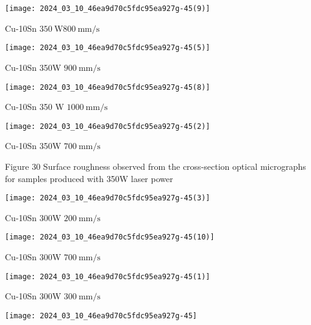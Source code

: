\documentclass[10pt]{article}
\begin{document}
\begin{center}
\texttt{[image: 2024\_03\_10\_46ea9d70c5fdc95ea927g-45(9)]}
\end{center}

Cu-10Sn $350 \mathrm{~W} 800 \mathrm{~mm} / \mathrm{s}$

\begin{center}
\texttt{[image: 2024\_03\_10\_46ea9d70c5fdc95ea927g-45(5)]}
\end{center}

Cu-10Sn 350W $900 \mathrm{~mm} / \mathrm{s}$

\begin{center}
\texttt{[image: 2024\_03\_10\_46ea9d70c5fdc95ea927g-45(8)]}
\end{center}

Cu-10Sn 350 W $1000 \mathrm{~mm} / \mathrm{s}$

\begin{center}
\texttt{[image: 2024\_03\_10\_46ea9d70c5fdc95ea927g-45(2)]}
\end{center}

Cu-10Sn 350W $700 \mathrm{~mm} / \mathrm{s}$

Figure 30 Surface roughness observed from the cross-section optical micrographs for samples produced with 350W laser power

\begin{center}
\texttt{[image: 2024\_03\_10\_46ea9d70c5fdc95ea927g-45(3)]}
\end{center}

Cu-10Sn 300W $200 \mathrm{~mm} / \mathrm{s}$

\begin{center}
\texttt{[image: 2024\_03\_10\_46ea9d70c5fdc95ea927g-45(10)]}
\end{center}

Cu-10Sn 300W $700 \mathrm{~mm} / \mathrm{s}$

\begin{center}
\texttt{[image: 2024\_03\_10\_46ea9d70c5fdc95ea927g-45(1)]}
\end{center}

Cu-10Sn 300W $300 \mathrm{~mm} / \mathrm{s}$

\begin{center}
\texttt{[image: 2024\_03\_10\_46ea9d70c5fdc95ea927g-45]}
\end{center}
\end{document}
